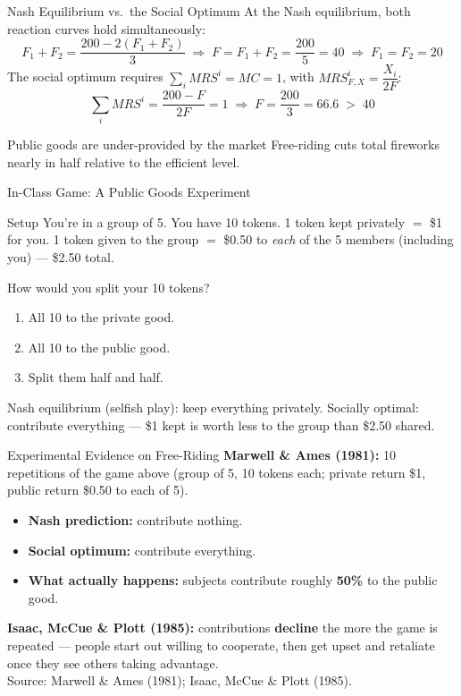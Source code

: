 \documentclass[11pt,aspectratio=169]{beamer}
\newcommand{\srcnote}[1]{{\footnotesize\color{wugray}Source: #1}}
\begin{document}
\begin{frame}{Nash Equilibrium vs.\ the Social Optimum}
  At the Nash equilibrium, both reaction curves hold simultaneously:
  \[ F_1+F_2 = \frac{200-2(F_1+F_2)}{3} \;\Rightarrow\; F = F_1+F_2 = \frac{200}{5} = 40 \;\Rightarrow\; F_1=F_2=20 \]
  The social optimum requires $\sum_i MRS^i = MC = 1$, with $MRS^i_{F,X} = \dfrac{X_i}{2F}$:
  \[ \sum_i MRS^i = \frac{200-F}{2F} = 1 \;\Rightarrow\; F = \frac{200}{3} = 66.6 \; > \; 40 \]
  \begin{alertblock}{Public goods are under-provided by the market}
    Free-riding cuts total fireworks nearly in half relative to the efficient level.
  \end{alertblock}
\end{frame}

\begin{frame}{In-Class Game: A Public Goods Experiment}
  \begin{block}{Setup}
    You're in a group of 5. You have 10 tokens. 1 token kept privately $=$ \$1 for you. 1 token given to the group $=$ \$0.50 to \emph{each} of the 5 members (including you) --- \$2.50 total.
  \end{block}
  How would you split your 10 tokens?
  \begin{enumerate}
    \item[A.] All 10 to the private good.
    \item[B.] All 10 to the public good.
    \item[C.] Split them half and half.
  \end{enumerate}
  \vspace{0.4em}
  \small Nash equilibrium (selfish play): keep everything privately. Socially optimal: contribute everything --- \$1 kept is worth less to the group than \$2.50 shared.
\end{frame}

\begin{frame}{Experimental Evidence on Free-Riding}
  \textbf{Marwell \& Ames (1981):} 10 repetitions of the game above (group of 5, 10 tokens each; private return \$1, public return \$0.50 to each of 5).
  \begin{itemize}
    \item \textbf{Nash prediction:} contribute nothing.
    \item \textbf{Social optimum:} contribute everything.
    \item \textbf{What actually happens:} subjects contribute roughly \textbf{50\%} to the public good.
  \end{itemize}
  \vspace{0.4em}
  \textbf{Isaac, McCue \& Plott (1985):} contributions \textbf{decline} the more the game is repeated --- people start out willing to cooperate, then get upset and retaliate once they see others taking advantage.\\
  \srcnote{Marwell \& Ames (1981); Isaac, McCue \& Plott (1985).}
\end{frame}
\end{document}
